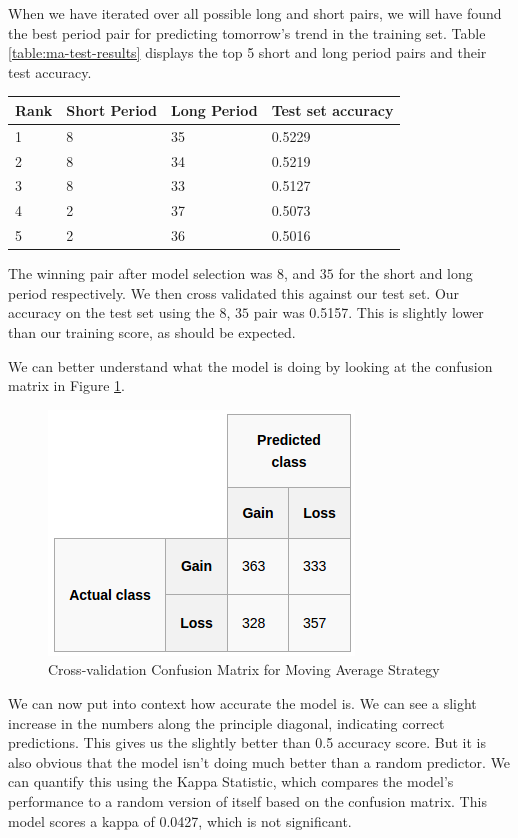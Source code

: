 \documentclass{report}
\begin{document}
When we have iterated over all possible long and short pairs, we will have found the best period pair for predicting tomorrow's trend in the training set. Table \ref{table:ma-test-results} displays the top 5 short and long period pairs and their test accuracy.


\begin{center}
    \begin{tabular}{l | l | l | l}
    Rank & Short Period & Long Period & Test set accuracy \\ \hline
    1 & 8 & 35 & 0.5229 \\ \hline
    2 & 8 & 34 & 0.5219 \\ \hline
    3 & 8 & 33 & 0.5127 \\ \hline
    4 & 2 & 37 & 0.5073 \\ \hline
    5 & 2 & 36 & 0.5016 
    \label{table:ma-test-results}
    \end{tabular}
\end{center}

The winning pair after model selection was $8$, and $35$ for the short and long period respectively. We then cross validated this against our test set. Our accuracy on the test set using the $8$, $35$ pair was 0.5157. This is slightly lower than our training score, as should be expected.

We can better understand what the model is doing by looking at the confusion matrix in Figure \ref{fig:ma-confusion}.

\begin{figure}[H]
	\caption{Cross-validation Confusion Matrix for Moving Average Strategy}
	\centerline{\includegraphics[scale=0.75]{vis/ma_confusion.png}}
	\label{fig:ma-confusion}
\end{figure}

We can now put into context how accurate the model is. We can see a slight increase in the numbers along the principle diagonal, indicating correct predictions. This gives us the slightly better than 0.5 accuracy score. But it is also obvious that the model isn't doing much better than a random predictor. We can quantify this using the Kappa Statistic, which compares the model's performance to a random version of itself based on the confusion matrix. This model scores a kappa of 0.0427, which is not significant. 
\end{document}
